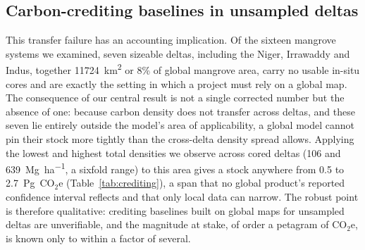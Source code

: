 \documentclass[twocolumn,9pt]{extarticle}
\begin{document}
\subsection*{Carbon-crediting baselines in unsampled deltas}
This transfer failure has an accounting implication. Of the sixteen mangrove systems we
examined, seven sizeable deltas, including the Niger, Irrawaddy and Indus, together
\SI{11724}{\kilo\metre\squared} or 8\% of global mangrove area, carry no usable in-situ
cores and are exactly the setting in which a project must rely on a global map. The
consequence of our central result is not a single corrected number but the absence of
one: because carbon density does not transfer across deltas, and these seven lie entirely
outside the model's area of applicability, a global model cannot pin their stock more
tightly than the cross-delta density spread allows. Applying the lowest and highest total
densities we observe across cored deltas (106 and \SI{639}{\mega\gram\per\hectare}, a
sixfold range) to this area gives a stock anywhere from 0.5 to
\SI{2.7}{\peta\gram}~CO$_2$e (Table~\ref{tab:crediting}), a span that no global product's
reported confidence interval reflects and that only local data can narrow. The robust
point is therefore qualitative: crediting baselines built on global maps for unsampled
deltas are unverifiable, and the magnitude at stake, of order a petagram of CO$_2$e, is
known only to within a factor of several.

\begin{table}[t]
\centering
\caption{Carbon at stake in the seven unsampled (prediction-only) deltas: mangrove area,
and the stock span obtained by applying the lowest and highest observed cross-delta
densities (106 and 639~Mg\,ha$^{-1}$). The span, not a point estimate, is the quantity a
global model cannot narrow because density does not transfer; all seven deltas lie outside
the area of applicability.}
\label{tab:crediting}

\end{table}
\end{document}
